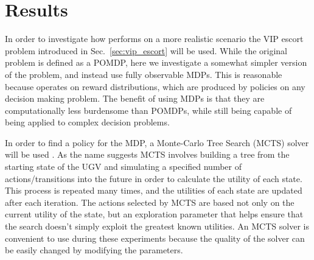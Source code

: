 \section{Results} \label{sec:results}
In order to investigate how \xQ{} performs on a more realistic scenario the VIP escort problem introduced in Sec.~\ref{sec:vip_escort} will be used. While the original problem is defined as a POMDP, here we investigate a somewhat simpler version of the problem, and instead use fully observable MDPs. This is reasonable because \xQ{} operates on reward distributions, which are produced by policies on any decision making problem. The benefit of using MDPs is that they are computationally less burdensome than POMDPs, while still being capable of being applied to complex decision problems.

In order to find a policy for the MDP, a Monte-Carlo Tree Search (MCTS) solver will be used \cite{Browne2012-fo}. As the name suggests MCTS involves building a tree from the starting state of the UGV and simulating a specified number of actions/transitions into the future in order to calculate the utility of each state. This process is repeated many times, and the utilities of each state are updated after each iteration. The actions selected by MCTS are based not only on the current utility of the state, but an exploration parameter that helps ensure that the search doesn't simply exploit the greatest known utilities. An MCTS solver is convenient to use during these experiments because the quality of the solver can be easily changed by modifying the parameters.

